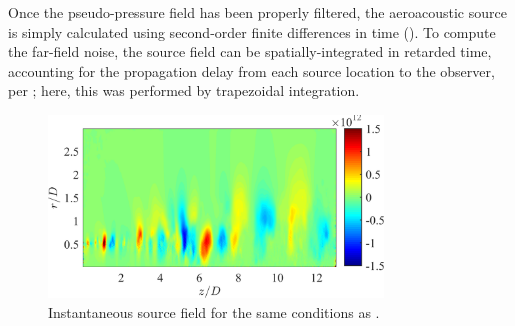 Once the pseudo-pressure field has been properly filtered, the aeroacoustic source is simply calculated using second-order finite differences in time ().
To compute the far-field noise, the source field can be spatially-integrated in retarded time, accounting for the propagation delay from each source location to the observer, per ; here, this was performed by trapezoidal integration. 
\begin{figure}
	\centering
	\includegraphics[width = 3.5in]{Figures/ch5_valid_Inst_source.png}
	\caption{Instantaneous source field for the same conditions as .}
	\label{fig:valid_source}
\end{figure}


